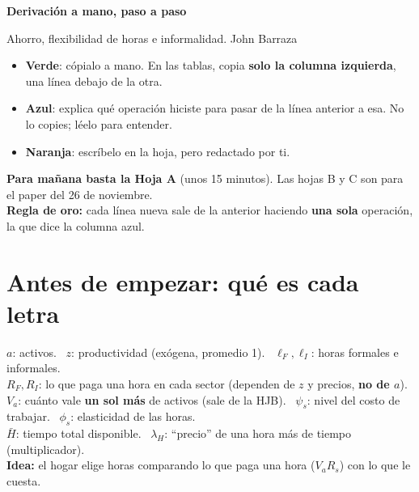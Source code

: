 \documentclass[11pt]{article}
\begin{document}
{\LARGE\bfseries Derivación a mano, paso a paso}\par
\smallskip
{\large Ahorro, flexibilidad de horas e informalidad. John Barraza}\par
\bigskip

\begin{tcolorbox}[colback=white,colframe=black!60,title=Cómo usar esta guía]
\begin{itemize}[leftmargin=*,itemsep=2pt]
\item[\textcolor{Escribe}{\rule{8pt}{8pt}}] \textbf{\textcolor{Escribe}{Verde}}: cópialo a mano. En las tablas, copia \textbf{solo la columna izquierda}, una línea debajo de la otra.
\item[\textcolor{Entiende}{\rule{8pt}{8pt}}] \textbf{\textcolor{Entiende}{Azul}}: explica qué operación hiciste para pasar de la línea anterior a esa. No lo copies; léelo para entender.
\item[\textcolor{Tuyo}{\rule{8pt}{8pt}}] \textbf{\textcolor{Tuyo}{Naranja}}: escríbelo en la hoja, pero redactado por ti.
\end{itemize}
\textbf{Para mañana basta la Hoja A} (unos 15 minutos). Las hojas B y C son para el paper del 26 de noviembre.\\
\textbf{Regla de oro:} cada línea nueva sale de la anterior haciendo \textbf{una sola} operación, la que dice la columna azul.
\end{tcolorbox}

\section*{Antes de empezar: qué es cada letra}
\begin{entiende}
$a$: activos. \ $z$: productividad (exógena, promedio 1). \ $\ell_F,\ell_I$: horas formales e informales.\\
$R_F,R_I$: lo que paga una hora en cada sector (dependen de $z$ y precios, \textbf{no de $a$}).\\
$V_a$: cuánto vale \textbf{un sol más} de activos (sale de la HJB). \ $\psi_s$: nivel del costo de trabajar. \ $\phi_s$: elasticidad de las horas.\\
$\bar H$: tiempo total disponible. \ $\lambda_H$: ``precio'' de una hora más de tiempo (multiplicador).\\[2pt]
\textbf{Idea:} el hogar elige horas comparando lo que paga una hora ($V_aR_s$) con lo que le cuesta.
\end{entiende}
\end{document}
